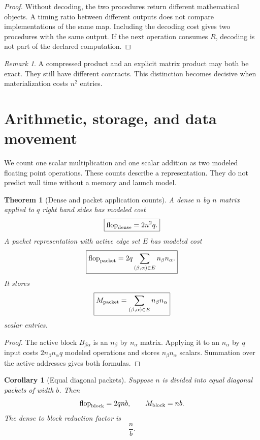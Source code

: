 \documentclass{aomart}
\newtheorem{theorem}{Theorem}[section]
\newtheorem{corollary}[corollary]{Corollary}
\theoremstyle{definition}
\theoremstyle{remark}
\newtheorem{remark}[remark]{Remark}
\newcommand{\flop}{\operatorname{flop}}
\begin{document}
\begin{proof}
Without decoding, the two procedures return different mathematical objects. A timing ratio between different outputs does not compare implementations of the same map. Including the decoding cost gives two procedures with the same output. If the next operation consumes \(R\), decoding is not part of the declared computation.
\end{proof}

\begin{remark}\label{rem:semantic_boundary}
A compressed product and an explicit matrix product may both be exact. They still have different contracts. This distinction becomes decisive when materialization costs \(n^2\) entries.
\end{remark}

\section{Arithmetic, storage, and data movement}\label{sec:cost}

We count one scalar multiplication and one scalar addition as two modeled floating point operations. These counts describe a representation. They do not predict wall time without a memory and launch model.

\begin{theorem}[Dense and packet application counts]\label{thm:packet_counts}
A dense \(n\) by \(n\) matrix applied to \(q\) right hand sides has modeled cost
\[
\boxed{
\flop_{\rm dense}=2n^2q.
}
\]
A packet representation with active edge set \(E\) has modeled cost
\[
\boxed{
\flop_{\rm packet}
=
2q
\sum_{(\beta,\alpha)\in E}
n_\beta n_\alpha.
}
\]
It stores
\[
\boxed{
M_{\rm packet}
=
\sum_{(\beta,\alpha)\in E}
n_\beta n_\alpha
}
\]
scalar entries.
\end{theorem}

\begin{proof}
The active block \(B_{\beta\alpha}\) is an \(n_\beta\) by \(n_\alpha\) matrix. Applying it to an \(n_\alpha\) by \(q\) input costs \(2n_\beta n_\alpha q\) modeled operations and stores \(n_\beta n_\alpha\) scalars. Summation over the active addresses gives both formulas.
\end{proof}

\begin{corollary}[Equal diagonal packets]\label{cor:equal_blocks}
Suppose \(n\) is divided into equal diagonal packets of width \(b\). Then
\[
\flop_{\rm block}=2qnb,
\qquad
M_{\rm block}=nb.
\]
The dense to block reduction factor is
\[
\boxed{
\frac{n}{b}.
}
\]
\end{corollary}
\end{document}
